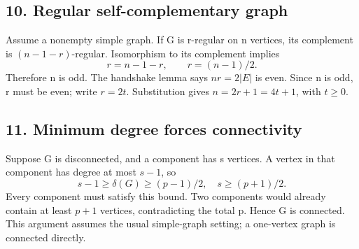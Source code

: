 \documentclass[11pt,a4paper]{article}
\begin{document}
\noindent\begin{minipage}{\linewidth}\subsection*{10. Regular self-complementary graph}

Assume a nonempty simple graph. If G is r-regular on n vertices, its complement is $(n-1-r)$-regular. Isomorphism to its complement implies
\[r=n-1-r,\qquad r=(n-1)/2.
\]
Therefore n is odd. The handshake lemma says $nr=2|E|$ is even. Since n is odd, r must be even; write $r=2t$. Substitution gives $n=2r+1=\boxed{4t+1}$, with $t\ge0$.
\end{minipage}\par\medskip
\noindent\begin{minipage}{\linewidth}\subsection*{11. Minimum degree forces connectivity}

Suppose G is disconnected, and a component has s vertices. A vertex in that component has degree at most $s-1$, so
\[s-1\ge\delta(G)\ge(p-1)/2,\quad s\ge(p+1)/2.
\]
Every component must satisfy this bound. Two components would already contain at least $p+1$ vertices, contradicting the total p. Hence G is connected. This argument assumes the usual simple-graph setting; a one-vertex graph is connected directly.
\end{minipage}\par\medskip
\end{document}
